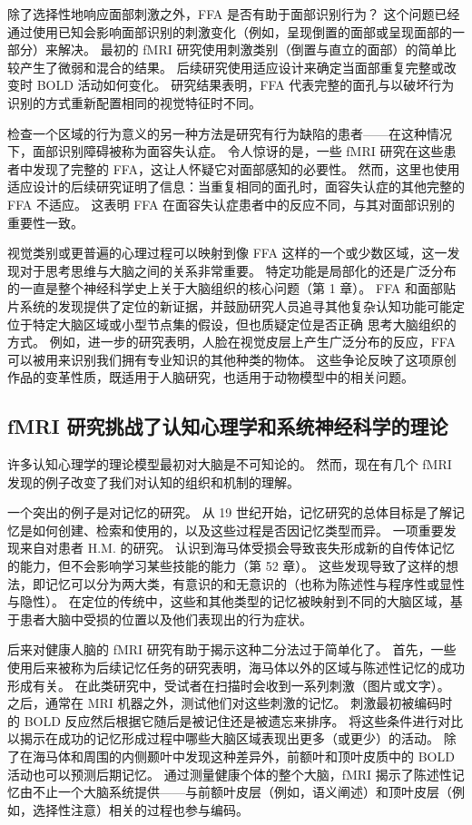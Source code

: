 除了选择性地响应面部刺激之外，FFA 是否有助于面部识别行为？ 这个问题已经通过使用已知会影响面部识别的刺激变化（例如，呈现倒置的面部或呈现面部的一部分）来解决。 最初的 fMRI 研究使用刺激类别（倒置与直立的面部）的简单比较产生了微弱和混合的结果。 后续研究使用适应设计来确定当面部重复完整或改变时 BOLD 活动如何变化。 研究结果表明，FFA 代表完整的面孔与以破坏行为识别的方式重新配置相同的视觉特征时不同。

检查一个区域的行为意义的另一种方法是研究有行为缺陷的患者——在这种情况下，面部识别障碍被称为面容失认症。 令人惊讶的是，一些 fMRI 研究在这些患者中发现了完整的 FFA，这让人怀疑它对面部感知的必要性。 然而，这里也使用适应设计的后续研究证明了信息：当重复相同的面孔时，面容失认症的其他完整的 FFA 不适应。 这表明 FFA 在面容失认症患者中的反应不同，与其对面部识别的重要性一致。

视觉类别或更普遍的心理过程可以映射到像 FFA 这样的一个或少数区域，这一发现对于思考思维与大脑之间的关系非常重要。 特定功能是局部化的还是广泛分布的一直是整个神经科学史上关于大脑组织的核心问题（第 1 章）。 FFA 和面部贴片系统的发现提供了定位的新证据，并鼓励研究人员追寻其他复杂认知功能可能定位于特定大脑区域或小型节点集的假设，但也质疑定位是否正确 思考大脑组织的方式。 例如，进一步的研究表明，人脸在视觉皮层上产生广泛分布的反应，FFA 可以被用来识别我们拥有专业知识的其他种类的物体。 这些争论反映了这项原创作品的变革性质，既适用于人脑研究，也适用于动物模型中的相关问题。


\subsection{fMRI 研究挑战了认知心理学和系统神经科学的理论}

许多认知心理学的理论模型最初对大脑是不可知论的。 然而，现在有几个 fMRI 发现的例子改变了我们对认知的组织和机制的理解。

一个突出的例子是对记忆的研究。 从 19 世纪开始，记忆研究的总体目标是了解记忆是如何创建、检索和使用的，以及这些过程是否因记忆类型而异。 一项重要发现来自对患者 H.M. 的研究。 认识到海马体受损会导致丧失形成新的自传体记忆的能力，但不会影响学习某些技能的能力（第 52 章）。 这些发现导致了这样的想法，即记忆可以分为两大类，有意识的和无意识的（也称为陈述性与程序性或显性与隐性）。 在定位的传统中，这些和其他类型的记忆被映射到不同的大脑区域，基于患者大脑中受损的位置以及他们表现出的行为症状。

后来对健康人脑的 fMRI 研究有助于揭示这种二分法过于简单化了。 首先，一些使用后来被称为后续记忆任务的研究表明，海马体以外的区域与陈述性记忆的成功形成有关。 在此类研究中，受试者在扫描时会收到一系列刺激（图片或文字）。 之后，通常在 MRI 机器之外，测试他们对这些刺激的记忆。 刺激最初被编码时的 BOLD 反应然后根据它随后是被记住还是被遗忘来排序。 将这些条件进行对比以揭示在成功的记忆形成过程中哪些大脑区域表现出更多（或更少）的活动。 除了在海马体和周围的内侧颞叶中发现这种差异外，前额叶和顶叶皮质中的 BOLD 活动也可以预测后期记忆。 通过测量健康个体的整个大脑，fMRI 揭示了陈述性记忆由不止一个大脑系统提供——与前额叶皮层（例如，语义阐述）和顶叶皮层（例如，选择性注意）相关的过程也参与编码。

